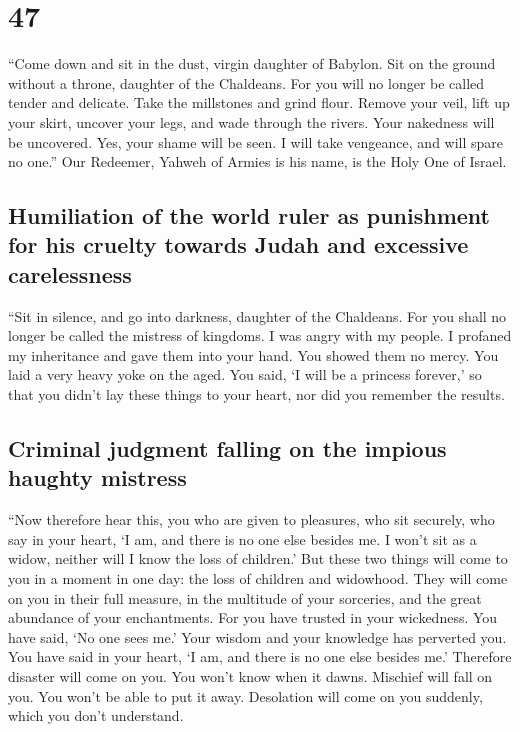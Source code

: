 \hypertarget{section-46}{%
\section{47}\label{section-46}}

 ``Come down and sit in the dust, virgin daughter of
Babylon. Sit on the ground without a throne, daughter of the Chaldeans.
For you will no longer be called tender and delicate. 
Take the millstones and grind flour. Remove your veil, lift up your
skirt, uncover your legs, and wade through the rivers. 
Your nakedness will be uncovered. Yes, your shame will be seen. I will
take vengeance, and will spare no one.''  Our Redeemer,
Yahweh of Armies is his name, is the Holy One of Israel.

\hypertarget{humiliation-of-the-world-ruler-as-punishment-for-his-cruelty-towards-judah-and-excessive-carelessness}{%
\subsection{Humiliation of the world ruler as punishment for his cruelty
towards Judah and excessive
carelessness}\label{humiliation-of-the-world-ruler-as-punishment-for-his-cruelty-towards-judah-and-excessive-carelessness}}

 ``Sit in silence, and go into darkness, daughter of the
Chaldeans. For you shall no longer be called the mistress of kingdoms.
 I was angry with my people. I profaned my inheritance and
gave them into your hand. You showed them no mercy. You laid a very
heavy yoke on the aged.  You said, `I will be a princess
forever,' so that you didn't lay these things to your heart, nor did you
remember the results.

\hypertarget{criminal-judgment-falling-on-the-impious-haughty-mistress}{%
\subsection{Criminal judgment falling on the impious haughty
mistress}\label{criminal-judgment-falling-on-the-impious-haughty-mistress}}

 ``Now therefore hear this, you who are given to
pleasures, who sit securely, who say in your heart, `I am, and there is
no one else besides me. I won't sit as a widow, neither will I know the
loss of children.'  But these two things will come to you
in a moment in one day: the loss of children and widowhood. They will
come on you in their full measure, in the multitude of your sorceries,
and the great abundance of your enchantments.  For you
have trusted in your wickedness. You have said, `No one sees me.' Your
wisdom and your knowledge has perverted you. You have said in your
heart, `I am, and there is no one else besides me.' 
Therefore disaster will come on you. You won't know when it dawns.
Mischief will fall on you. You won't be able to put it away. Desolation
will come on you suddenly, which you don't understand.

